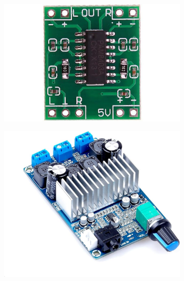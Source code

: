 \begin{figure}[h]
	\centering
	\begin{subfigure}[b]{0.22\textwidth}
		\centering
		\includegraphics[width=\textwidth]{assets/ch2/PAM8403}
		\caption{}
		\label{fig:pam8403}
	\end{subfigure}
	\hfill
	\begin{subfigure}[b]{0.22\textwidth}
		\centering
		\includegraphics[width=\textwidth]{assets/ch2/TPA3116D2}
		\caption{}
		\label{fig:tpa3116d2}
	\end{subfigure}
	\hfill
	\begin{subfigure}[b]{0.22\textwidth}
		\centering

\end{subfigure}
\end{figure}
